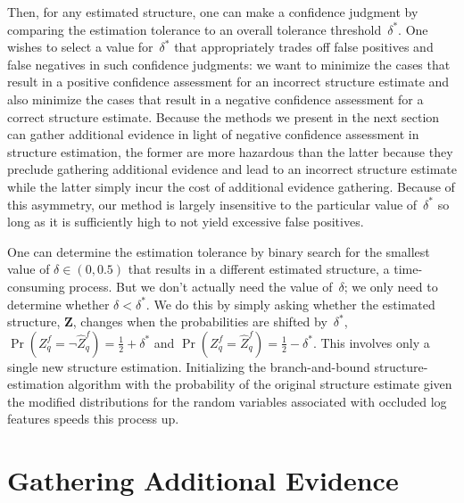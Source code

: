 %
Then, for any estimated structure, one can make a confidence judgment by
comparing the estimation tolerance to an overall tolerance threshold~$\delta^*$.
%
One wishes to select a value for~$\delta^*$ that appropriately trades off false
positives and false negatives in such confidence judgments: we want to
minimize the cases that result in a positive confidence assessment for an
incorrect structure estimate and also minimize the cases that result in a
negative confidence assessment for a correct structure estimate.
%
Because the methods we present in the next section can gather additional
evidence in light of negative confidence assessment in structure estimation,
the former are more hazardous than the latter because they preclude gathering
additional evidence and lead to an incorrect structure estimate while the
latter simply incur the cost of additional evidence gathering.
%
Because of this asymmetry, our method is largely insensitive to the particular
value of~$\delta^*$ so long as it is sufficiently high to not yield excessive
false positives.

One can determine the estimation tolerance by binary search for the smallest
value of $\delta\in(0,0.5)$ that results in a different estimated structure, a
time-consuming process.
%
But we don't actually need the value of~$\delta$; we only need to determine
whether $\delta<\delta^*$.
%
We do this by simply asking whether the estimated structure, $\mathbf{Z}$,
changes when the probabilities are shifted by~$\delta^*$, \ie\
%
\begin{math}
    \Pr(Z^f_q=\neg\hat{Z}^f_q)=\frac{1}{2}+\delta^{*}
\end{math}
and
\begin{math}
    \Pr(Z^f_q=\hat{Z}^f_q)=\frac{1}{2}-\delta^{*}
\end{math}.
%
This involves only a single new structure estimation.
%
Initializing the branch-and-bound structure-estimation algorithm with the
probability of the original structure estimate given the modified distributions
for the random variables associated with occluded log features speeds this
process up.

\par\vspace{-1ex}
\section{Gathering Additional Evidence}
\label{sec-ll2:integration}

